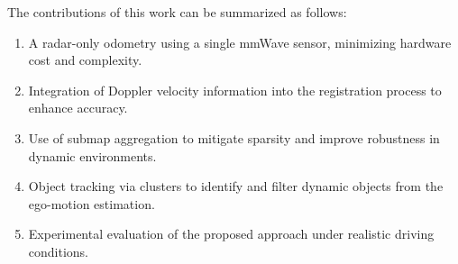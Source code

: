 The contributions of this work can be summarized as follows:  
\begin{enumerate}
    \item A radar-only odometry using a single mmWave sensor, minimizing hardware cost and complexity.  
    \item Integration of Doppler velocity information into the registration process to enhance accuracy.  
    \item Use of submap aggregation to mitigate sparsity and improve robustness in dynamic environments.  
    \item Object tracking via clusters to identify and filter dynamic objects from the ego-motion estimation.
    \item Experimental evaluation of the proposed approach under realistic driving conditions.  
\end{enumerate}
